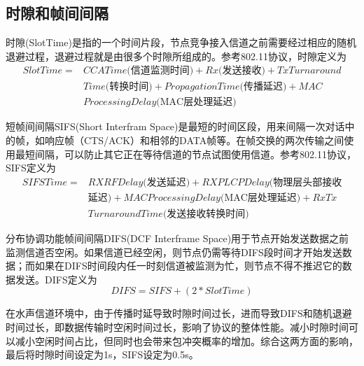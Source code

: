 \subsection{时隙和帧间间隔}
时隙(SlotTime)是指的一个时间片段，节点竞争接入信道之前需要经过相应的随机退避过程，退避过程就是由很多个时隙所组成的。参考802.11协议\cite{bianchi2000performance}，时隙定义为
\begin{equation}
\begin{aligned}
SlotTime=&CCATime\mbox{(信道监测时间)}+Rx\mbox{(发送接收)}+TxTurnaround\\&Time\mbox{(转换时间)}+PropagationTime\mbox{(传播延迟)}+MAC\\&ProcessingDelay\mbox{(MAC层处理延迟)}
\end{aligned}
\end{equation}

短帧间间隔SIFS(Short Interfram Space)是最短的时间区段，用来间隔一次对话中的帧，如响应帧（CTS/ACK）和相邻的DATA帧等。在帧交换的两次传输之间使用最短间隔，可以防止其它正在等待信道的节点试图使用信道。参考802.11协议，SIFS定义为
\begin{equation}
\begin{aligned}
SIFSTime=&RXRFDelay\mbox{(发送延迟)}+RXPLCPDelay\mbox{(物理层头部接收}\\&\mbox{延迟)}+MACProcessingDelay\mbox{(MAC层处理延迟)}+ RxTx\\&TurnaroundTime\mbox{(发送接收转换时间)}
\end{aligned}
\end{equation}

分布协调功能帧间间隔DIFS(DCF Interframe Space)用于节点开始发送数据之前监测信道否空闲。如果信道已经空闲，则节点仍需等待DIFS段时间才开始发送数据；而如果在DIFS时间段内任一时刻信道被监测为忙，则节点不得不推迟它的数据发送。DIFS定义为
\begin{equation}
DIFS=SIFS+(2*SlotTime)
\end{equation}

在水声信道环境中，由于传播时延导致时隙时间过长，进而导致DIFS和随机退避时间过长，即数据传输时空闲时间过长，影响了协议的整体性能。减小时隙时间可以减小空闲时间占比，但同时也会带来包冲突概率的增加。综合这两方面的影响，最后将时隙时间设定为1s，SIFS设定为0.5s。
